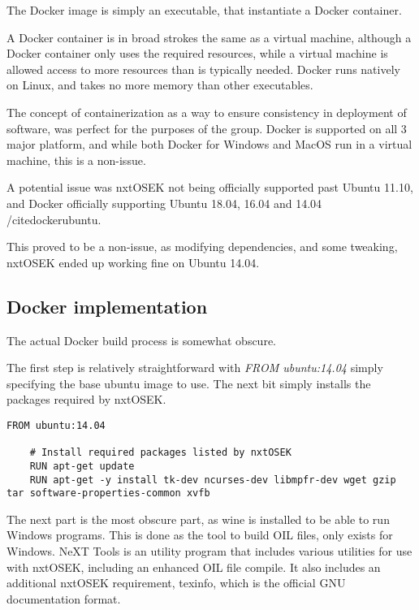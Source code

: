 The Docker image is simply an executable, that instantiate a Docker container.

A Docker container is in broad strokes the same as a virtual machine, although a Docker container only uses the required resources, while a virtual machine is allowed access to more resources than is typically needed.
Docker runs natively on Linux, and takes no more memory than other executables.

The concept of containerization as a way to ensure consistency in deployment of software, was perfect for the purposes of the group.
Docker is supported on all 3 major platform, and while both Docker for Windows and MacOS run in a virtual machine, this is a non-issue.

A potential issue was nxtOSEK not being officially supported past Ubuntu 11.10, and Docker officially supporting Ubuntu 18.04, 16.04 and 14.04 /cite{dockerubuntu}.

This proved to be a non-issue, as modifying dependencies, and some tweaking, nxtOSEK ended up working fine on Ubuntu 14.04.

\subsection{Docker implementation}\label{subsec:dockerimplementation}
The actual Docker build process is somewhat obscure.

The first step is relatively straightforward with \textit{FROM ubuntu:14.04} simply specifying the base ubuntu image to use.
The next bit simply installs the packages required by nxtOSEK.
\begin{lstlisting}[language=docker,label={lst:dockerimplementation1},caption={Version definition and installation of packages required by nxtOSEK}]
    FROM ubuntu:14.04

    # Install required packages listed by nxtOSEK
    RUN apt-get update
    RUN apt-get -y install tk-dev ncurses-dev libmpfr-dev wget gzip tar software-properties-common xvfb
\end{lstlisting} 

The next part is the most obscure part, as wine is installed to be able to run Windows programs.
This is done as the tool to build OIL files, only exists for Windows.
NeXT Tools is an utility program that includes various utilities for use with nxtOSEK, including an enhanced OIL file compile\cite{nxttool}.
It also includes an additional nxtOSEK requirement, texinfo, which is the official GNU documentation format\cite{texinfo}.

